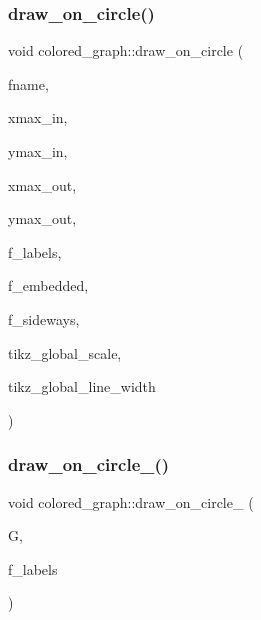 \subsubsection{\texorpdfstring{draw\+\_\+on\+\_\+circle()}{draw\_on\_circle()}}
{\footnotesize\ttfamily void colored\+\_\+graph\+::draw\+\_\+on\+\_\+circle (\begin{DoxyParamCaption}\item[{char $\ast$}]{fname,  }\item[{\mbox{\hyperlink{galois_8h_a09fddde158a3a20bd2dcadb609de11dc}{I\+NT}}}]{xmax\+\_\+in,  }\item[{\mbox{\hyperlink{galois_8h_a09fddde158a3a20bd2dcadb609de11dc}{I\+NT}}}]{ymax\+\_\+in,  }\item[{\mbox{\hyperlink{galois_8h_a09fddde158a3a20bd2dcadb609de11dc}{I\+NT}}}]{xmax\+\_\+out,  }\item[{\mbox{\hyperlink{galois_8h_a09fddde158a3a20bd2dcadb609de11dc}{I\+NT}}}]{ymax\+\_\+out,  }\item[{\mbox{\hyperlink{galois_8h_a09fddde158a3a20bd2dcadb609de11dc}{I\+NT}}}]{f\+\_\+labels,  }\item[{\mbox{\hyperlink{galois_8h_a09fddde158a3a20bd2dcadb609de11dc}{I\+NT}}}]{f\+\_\+embedded,  }\item[{\mbox{\hyperlink{galois_8h_a09fddde158a3a20bd2dcadb609de11dc}{I\+NT}}}]{f\+\_\+sideways,  }\item[{double}]{tikz\+\_\+global\+\_\+scale,  }\item[{double}]{tikz\+\_\+global\+\_\+line\+\_\+width }\end{DoxyParamCaption})}

\mbox{\label{classcolored__graph_af6dd79e0c699432153b1a8cb60f5afad}} 
\subsubsection{\texorpdfstring{draw\+\_\+on\+\_\+circle\+\_()}{draw\_on\_circle\_2()}}
{\footnotesize\ttfamily void colored\+\_\+graph\+::draw\+\_\+on\+\_\+circle\+\_ (\begin{DoxyParamCaption}\item[{\mbox{\hyperlink{classmp__graphics}{mp\+\_\+graphics}} \&}]{G,  }\item[{\mbox{\hyperlink{galois_8h_a09fddde158a3a20bd2dcadb609de11dc}{I\+NT}}}]{f\+\_\+labels }\end{DoxyParamCaption})}

